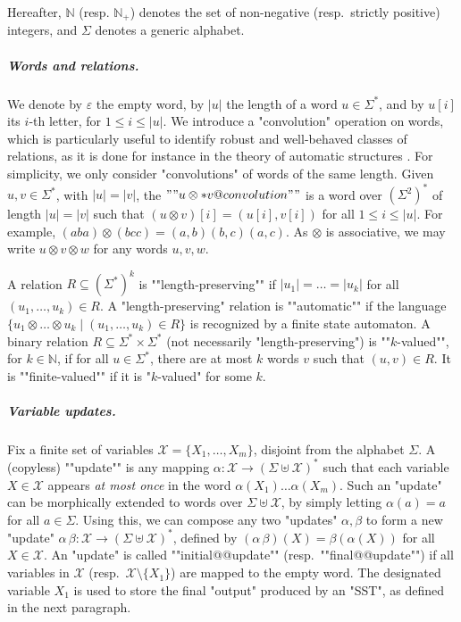\documentclass{theoretics}
\newcommand{\var}{\mathcal{X}}
\newcommand{\alp}{\Sigma}
\begin{document}
Hereafter, $\mathbb{N}$ (resp. $\mathbb{N}_+$) 
denotes the set of non-negative (resp.~strictly positive) integers,
and $\alp$ denotes a generic alphabet.


\medskip
\subparagraph*{\bf Words and relations.}
We denote by $\varepsilon$ the empty word, 
by $|u|$ the length of a word $u\in\alp^*$, and by
$u[i]$ its $i$-th letter, for $1\leq i\leq |u|$. 
We introduce a "convolution" operation on words,
which is particularly useful to identify robust and
well-behaved classes of relations, 
as it is done for instance in the theory of automatic structures \cite{BlumensathG00}.
For simplicity, we only consider "convolutions" of 
words of the same length. 
\AP
Given $u,v\in\alp^*$, with $|u|=|v|$,
the  $""u \otimes* v@convolution""$ 
is a word over $(\alp^2)^*$ of length $|u|=|v|$ such that 
$(u\otimes v)[i] = (u[i],v[i])$ for all $1\leq i\leq |u|$. 
For example, $(aba)\otimes (bcc) = (a,b)(b,c)(a,c)$. 
As $\otimes$ is associative, we may write 
$u\otimes v\otimes w$ for any words $u,v,w$. 

\AP
A relation $R\subseteq (\alp^*)^k$ is ""length-preserving""
if $|u_1|=\dots=|u_k|$ for all $(u_1,\dots,u_k)\in R$. 
\AP
A "length-preserving" relation is ""automatic""
if the language 
$\{ u_1\otimes \dots \otimes u_k \mid (u_1,\dots,u_k)\in R\}$ 
is recognized by a finite state automaton.
\AP
A binary relation $R\subseteq \alp^*\times \alp^*$ (not
necessarily "length-preserving")
is ""$k$-valued"", for $k\in\mathbb{N}$, if for all $u\in\alp^*$, 
there are at most $k$ words $v$ such that $(u,v)\in R$. 
\AP
It is ""finite-valued"" if it is "$k$-valued" for some $k$.



\medskip
\subparagraph*{\bf Variable updates.} 
Fix a finite set of variables $\var = \{X_1, \dots, X_m\}$,
disjoint from the alphabet $\alp$.
\AP
A (copyless) ""update"" is any mapping 
$\alpha: \var\rightarrow (\alp \uplus \var)^*$
such that each variable $X\in\var$ appears \emph{at most once}
in the word $\alpha(X_1)\dots\alpha(X_m)$.
Such an "update" can be morphically extended to words over $\alp\uplus\var$,
by simply letting $\alpha(a) = a$ for all $a\in\alp$.
Using this, we can compose any two "updates" $\alpha,\beta$ to form 
a new "update" $\alpha \, \beta : \var \rightarrow (\alp \uplus \var)^*$, 
defined by $(\alpha \, \beta)(X) = \beta(\alpha(X))$ for all $X\in\var$.
\AP
An "update" is called ""initial@@update"" (resp.~""final@@update"")
if all variables in $\var$ (resp.~$\var\setminus\{X_1\}$) are mapped
to the empty word. The designated variable $X_1$ is used to store
the final "output" produced by an "SST", as defined in the next
paragraph.
\end{document}
